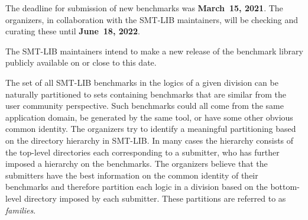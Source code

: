 \documentclass[12pt]{article}
\begin{document}
The deadline for submission of new benchmarks was {\bf March~15, 2021}.
%
The organizers, in collaboration with the SMT-LIB maintainers, will be
checking and curating these until {\bf June~18, 2022}.

The SMT-LIB
maintainers intend to make a new release of the benchmark library
publicly available on or close to this date.

%
The set of all SMT-LIB benchmarks in the logics of a given division can be
naturally partitioned to sets containing benchmarks that are similar from the
user community perspective.
%
Such benchmarks could all come from the same
application domain, be generated by the same tool, or have some other
obvious common identity.
%
The organizers try to identify a meaningful partitioning based on the
directory hierarchy in SMT-LIB.  In many cases the hierarchy consists of
the top-level directories each corresponding to a submitter, who has
further imposed a hierarchy on the benchmarks.
%
The organizers believe that the submitters have the best information on the
common identity of their benchmarks and therefore partition each logic in a
division based on the bottom-level directory imposed by each submitter.  These
partitions are referred to as \emph{families}.
\end{document}
